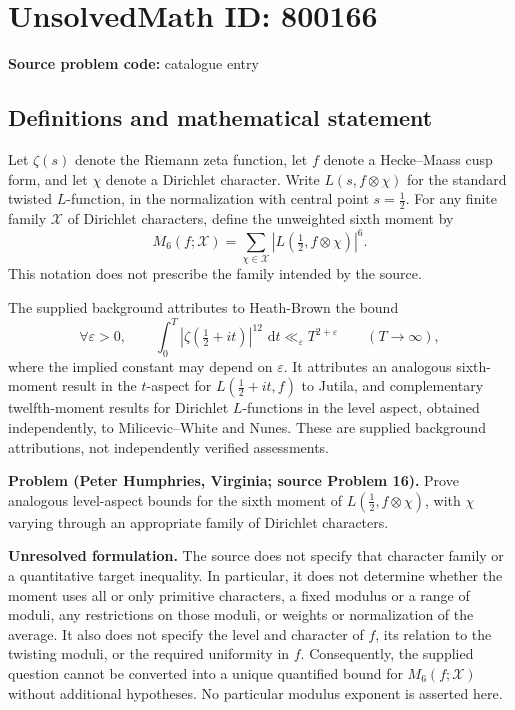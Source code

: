 \documentclass[11pt]{article}
\newcommand{\dd}{\,\mathrm{d}}
\begin{document}
\section*{UnsolvedMath ID: 800166}
\textbf{Source problem code:} catalogue entry
\subsection{Definitions and mathematical statement}
Let \(\zeta(s)\) denote the Riemann zeta function, let \(f\) denote a Hecke--Maass cusp form, and let \(\chi\) denote a Dirichlet character. Write \(L(s,f\otimes\chi)\) for the standard twisted \(L\)-function, in the normalization with central point \(s=\tfrac12\). For any finite family \(\mathcal X\) of Dirichlet characters, define the unweighted sixth moment by
\[
M_6(f;\mathcal X)=\sum_{\chi\in\mathcal X}\left|L\!\left(\tfrac12,f\otimes\chi\right)\right|^6.
\]
This notation does not prescribe the family intended by the source.

The supplied background attributes to Heath-Brown the bound
\[
\forall\varepsilon>0,\qquad
\int_0^T\left|\zeta\!\left(\tfrac12+it\right)\right|^{12}\,\dd t
\ll_{\varepsilon}T^{2+\varepsilon}
\qquad(T\to\infty),
\]
where the implied constant may depend on \(\varepsilon\). It attributes an analogous sixth-moment result in the \(t\)-aspect for \(L(\tfrac12+it,f)\) to Jutila, and complementary twelfth-moment results for Dirichlet \(L\)-functions in the level aspect, obtained independently, to Milicevic--White and Nunes. These are supplied background attributions, not independently verified assessments.

\textbf{Problem (Peter Humphries, Virginia; source Problem 16).} Prove analogous level-aspect bounds for the sixth moment of \(L(\tfrac12,f\otimes\chi)\), with \(\chi\) varying through an appropriate family of Dirichlet characters.

\textbf{Unresolved formulation.} The source does not specify that character family or a quantitative target inequality. In particular, it does not determine whether the moment uses all or only primitive characters, a fixed modulus or a range of moduli, any restrictions on those moduli, or weights or normalization of the average. It also does not specify the level and character of \(f\), its relation to the twisting moduli, or the required uniformity in \(f\). Consequently, the supplied question cannot be converted into a unique quantified bound for \(M_6(f;\mathcal X)\) without additional hypotheses. No particular modulus exponent is asserted here.
\end{document}
